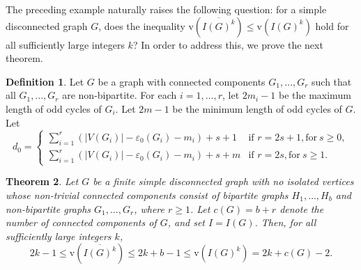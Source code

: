 \documentclass[11pt,reqno,a4paper]{amsart}
\newtheorem{theorem}{Theorem}[section]
\theoremstyle{definition}
\newtheorem{definition}[theorem]{Definition}
\begin{document}
The preceding example naturally raises the following question: for a simple disconnected graph \(G\), does the inequality
\(
\mathrm{v}(\overline{I(G)^k}) \le \mathrm{v}(I(G)^k)
\)
hold for all sufficiently large integers \(k\)? In order to address this,  we prove the next theorem.



\begin{definition}
\label{def:do}
\cite[Definition 3.3]{MauTrung21}
Let \(G\) be a graph with connected components \(G_1,\ldots,G_r\) such that all \(G_1,\ldots,G_r\) are non-bipartite. For each \(i=1,\ldots,r\), let \(2m_i-1\) be the maximum length of odd cycles of \(G_i\). Let \(2m-1\) be the minimum length of odd cycles of \(G\). Let
\[
d_0=
\begin{cases}

\sum_{i=1}^{r}(|V(G_i)|-\varepsilon_0(G_i)-m_i)+s+1 & \text{if } r=2s+1,  \text{for}\ s\ge 0,\\[4pt]
\sum_{i=1}^{r}(|V(G_i)|-\varepsilon_0(G_i)-m_i)+s+m & \text{if } r=2s,    \text{for}\ s\ge 1.
\end{cases}
\]
\end{definition}




\begin{theorem}\label{v-numberofdisconnectedgraphs}
Let \(G\) be a finite simple disconnected graph with no isolated vertices whose non-trivial connected components consist of bipartite graphs \(H_1,\ldots,H_b\) and non-bipartite graphs \(G_1,\ldots,G_r\), where \(r \ge 1\). Let \(c(G) = b + r\) denote the number of connected components of \(G\), and set \(I = I(G)\). Then, for all sufficiently large integers \(k\),
\[
2k - 1 \le \mathrm{v}(\overline{I(G)^k}) \le 2k + b - 1 \le \mathrm{v}(I(G)^k) = 2k + c(G) - 2.
\]
\end{theorem}
\end{document}
